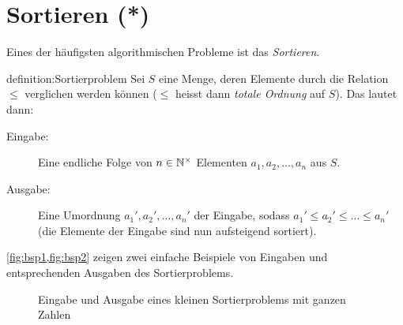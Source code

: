 \chapter{Sortieren (*)}\label{ch:Kapitel05}

Eines der häufigsten algorithmischen Probleme ist das \textit{Sortieren}.
\begin{definition}[Sortierproblem]{definition:Sortierproblem}
    Sei $S$ eine Menge, deren Elemente durch die Relation $\leq$ verglichen werden können ($\leq$ heisst dann \textit{totale Ordnung} auf $S$). Das  lautet dann:
    \begin{description}
        \item[Eingabe:] Eine endliche Folge von $n\in\mathbb{N}^{\times}$ Elementen $a_1,a_2,\ldots,a_n$ aus $S$.
        \item[Ausgabe:] Eine Umordnung $a_1', a_2', \ldots, a_n'$ der Eingabe, sodass $a_1'\leq a_2' \leq \ldots \leq a_n'$ (die Elemente der Eingabe sind nun aufsteigend sortiert).
    \end{description}
\end{definition}
\cref{fig:bsp1,fig:bsp2} zeigen zwei einfache Beispiele von Eingaben und entsprechenden Ausgaben des Sortierproblems.

\begin{figure}[H]
    \def\lvld{1.2}                  %
    \pgfmathsetmacro\shft{-6*\lvld} %
    \centering
{}
    \caption{Eingabe und Ausgabe eines kleinen Sortierproblems mit ganzen Zahlen}
    \label{fig:bsp1}
\end{figure}

